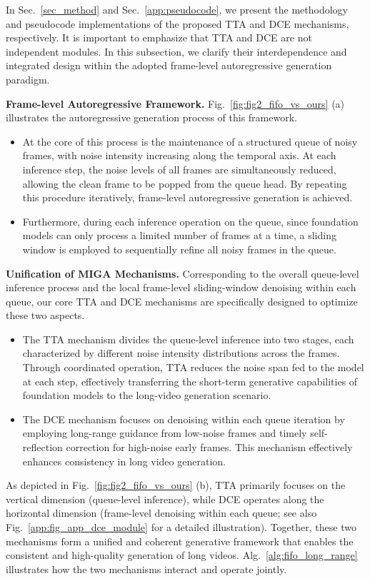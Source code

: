 \documentclass{llmxive}
\begin{document}
In Sec.~\ref{sec_method} and Sec.~\ref{app:pseudocode}, we present the methodology and pseudocode implementations of the proposed TTA and DCE mechanisms, respectively. It is important to emphasize that TTA and DCE are not independent modules. In this subsection, we clarify their interdependence and integrated design within the adopted frame-level autoregressive generation paradigm.


\textbf{Frame-level Autoregressive Framework.}
Fig.~\ref{fig:fig2_fifo_vs_ours} (a) illustrates the autoregressive generation process of this framework.
\begin{itemize}
    \item At the core of this process is the maintenance of a structured queue of noisy frames, with noise intensity increasing along the temporal axis. At each inference step, the noise levels of all frames are simultaneously reduced, allowing the clean frame to be popped from the queue head. By repeating this procedure iteratively, frame-level autoregressive generation is achieved.
    \item Furthermore, during each inference operation on the queue, since foundation models can only process a limited number of frames at a time, a sliding window is employed to sequentially refine all noisy frames in the queue.
\end{itemize}


\textbf{Unification of MIGA Mechanisms.}
Corresponding to the overall queue-level inference process and the local frame-level sliding-window denoising within each queue, our core TTA and DCE mechanisms are specifically designed to optimize these two aspects.
\begin{itemize}
    \item The TTA mechanism divides the queue-level inference into two stages, each characterized by different noise intensity distributions across the frames. Through coordinated operation, TTA reduces the noise span fed to the model at each step, effectively transferring the short-term generative capabilities of foundation models to the long-video generation scenario.
    \item The DCE mechanism focuses on denoising within each queue iteration by employing long-range guidance from low-noise frames and timely self-reflection correction for high-noise early frames. This mechanism effectively enhances consistency in long video generation.
\end{itemize}


As depicted in Fig.~\ref{fig:fig2_fifo_vs_ours} (b), TTA primarily focuses on the vertical dimension (queue-level inference), while DCE operates along the horizontal dimension (frame-level denoising within each queue; see also Fig.~\ref{app:fig_app_dce_module} for a detailed illustration).
Together, these two mechanisms form a unified and coherent generative framework that enables the consistent and high-quality generation of long videos.  Alg.~\ref{alg:fifo_long_range} illustrates how the two mechanisms interact and operate jointly.
\end{document}
